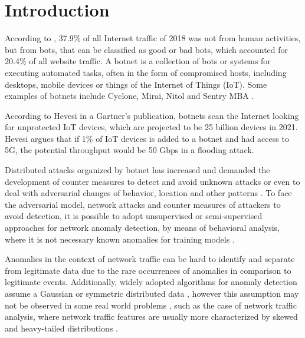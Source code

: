 \documentclass[review]{elsarticle}
\begin{document}
\linenumbers

\section{Introduction}
\label{sec:introduction}


According to \cite{distilnetworks2019}, 37.9\% of all Internet traffic of 2018 was not from human activities, but from bots, that can be classified as good or bad bots, which accounted for 20.4\% of all website traffic. A botnet is a collection of bots or systems for executing automated tasks, often in the form of compromised hosts, including desktops, mobile devices or things of the Internet of Things (IoT). Some examples of botnets include Cyclone, Mirai, Nitol and Sentry MBA \cite{Catucci2019}. 

According to Hevesi \cite{Hevesi2019} in a Gartner's publication, botnets scan the Internet looking for unprotected IoT devices, which are projected to be 25 billion devices in 2021. Hevesi argues that if 1\% of IoT devices is added to a botnet and had access to 5G, the potential throughput would be 50 Gbps in a flooding attack.

Distributed attacks organized by botnet has increased and demanded the development of counter measures to detect and avoid unknown attacks or even to deal with adversarial changes of behavior, location and other patterns \cite{wang2017botnet, Wang2018ddosbotnetssurvey}. To face the adversarial model, network attacks and counter measures of attackers to avoid detection, it is possible to adopt unsupervised or semi-supervised approaches for network anomaly detection, by means of behavioral analysis, where it is not necessary known anomalies for training models \cite{moustafa2019holistic}. 

Anomalies in the context of network traffic can be hard to identify and separate from legitimate data due to the rare occurrences of anomalies in comparison to legitimate events. Additionally, widely adopted algorithms for anomaly detection assume a Gaussian or symmetric distributed data \cite{lakhina2005mining}, however this assumption may not be observed in some real world problems \cite{benson2010network}, such as the case of network traffic analysis, where network traffic features are usually more characterized by skewed and heavy-tailed distributions \cite{leon2017probability}.
\end{document}
